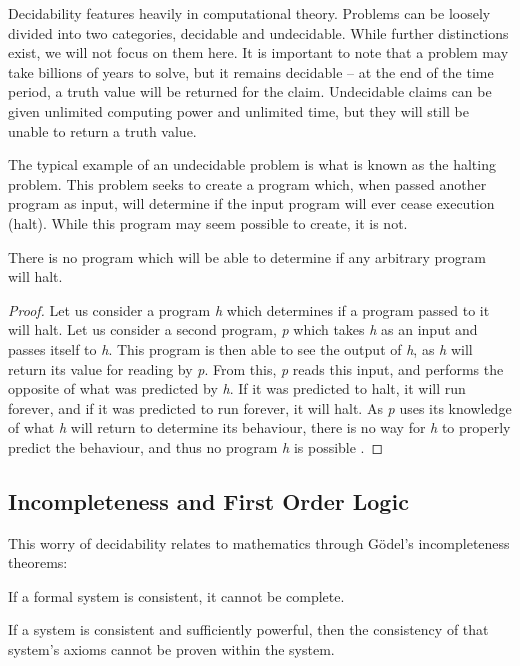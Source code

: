 Decidability features heavily in computational theory. Problems can be loosely divided into two categories, decidable and undecidable. While further distinctions exist, we will not focus on them here. It is important to note that a problem may take billions of years to solve, but it remains decidable -- at the end of the time period, a truth value will be returned for the claim. Undecidable claims can be given unlimited computing power and unlimited time, but they will still be unable to return a truth value.

The typical example of an undecidable problem is what is known as the halting problem. This problem seeks to create a program which, when passed another program as input, will determine if the input program will ever cease execution (halt). While this program may seem possible to create, it is not.

\begin{theorem}
There is no program which will be able to determine if any arbitrary program will halt.
\end{theorem}
\begin{proof}
Let us consider a program \textit{h} which determines if a program passed to it will halt. Let us consider a second program, \textit{p} which takes \textit{h} as an input and passes itself to \textit{h}. This program is then able to see the output of \textit{h}, as \textit{h} will return its value for reading by \textit{p}. From this, \textit{p} reads this input, and performs the opposite of what was predicted by \textit{h}. If it was predicted to halt, it will run forever, and if it was predicted to run forever, it will halt. As \textit{p} uses its knowledge of what \textit{h} will return to determine its behaviour, there is no way for \textit{h} to properly predict the behaviour, and thus no program \textit{h} is possible \cite{haltProof}.
\end{proof}

\subsection{Incompleteness and First Order Logic}\label{incompleteness}
This worry of decidability relates to mathematics through G\"odel's incompleteness theorems:
\begin{theorem}
	\cite{godel} If a formal system is consistent, it cannot be complete.
\end{theorem}
\begin{theorem}
	\cite{godel} If a system is consistent and sufficiently powerful, then the consistency of that system's axioms cannot be proven within the system.
\end{theorem}

